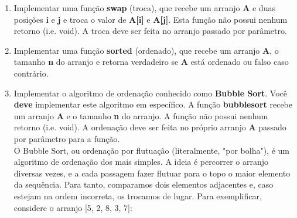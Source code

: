 \documentclass[a4paper, 11pt]{article}
\begin{document}
\begin{enumerate}
\item Implementar uma função \textbf{swap} (troca), que recebe um arranjo \textbf{A} e duas posições
\textbf{i} e \textbf{j} e troca o valor de \textbf{A[i]} e \textbf{A[j]}. Esta função não possui nenhum retorno
(i.e. void). A troca deve ser feita no arranjo passado por parâmetro.

\item Implementar uma função \textbf{sorted} (ordenado), que recebe um arranjo \textbf{A}, o tamanho
\textbf{n} do arranjo e retorna verdadeiro se \textbf{A} está ordenado ou falso caso contrário.

\item Implementar o algoritmo de ordenação conhecido como \textbf{Bubble Sort}. Você \textbf{deve} implementar este
algoritmo em específico. A função \textbf{bubblesort} recebe um arranjo \textbf{A} e o tamanho \textbf{n} do arranjo.
A função não possui nenhum retorno (i.e. void). A ordenação deve ser feita no próprio arranjo
\textbf{A} passado por parâmetro para a função. \\

O Bubble Sort, ou ordenação por flutuação (literalmente, "por bolha"), é um algoritmo de ordenação
dos mais simples. A ideia é percorrer o arranjo diversas vezes, e a cada passagem fazer flutuar para
o topo o maior elemento da sequência. Para tanto, comparamos dois elementos adjacentes e, caso estejam
na ordem incorreta, os trocamos de lugar. Para exemplificar, considere o arranjo [5, 2, 8, 3, 7]:

\begin{center}
\end{center}
\end{enumerate}
\end{document}
